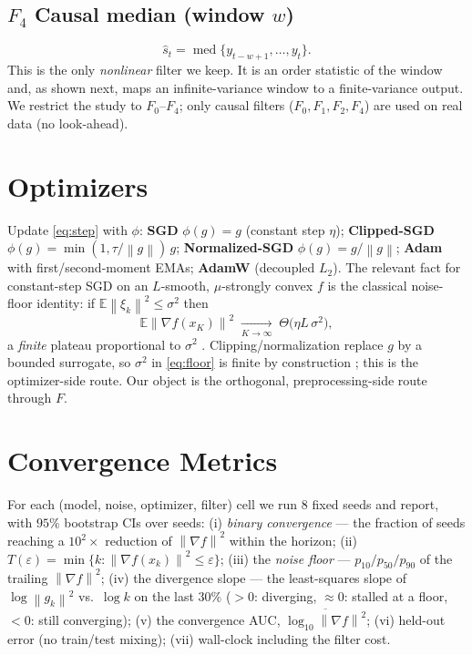 \documentclass[conference]{IEEEtran}
\newcommand{\E}{\mathbb{E}}
\newcommand{\norm}[1]{\left\lVert#1\right\rVert}
\DeclareMathOperator{\med}{med}
\begin{document}
\subsection{$F_4$ Causal median (window $w$)}
\begin{equation}
\hat s_t=\med\{y_{t-w+1},\dots,y_t\}. \label{eq:median}
\end{equation}
This is the only \emph{nonlinear} filter we keep. It is an order
statistic of the window and, as shown next, maps an infinite-variance
window to a finite-variance output. We restrict the study to
$F_0$--$F_4$; only causal filters ($F_0,F_1,F_2,F_4$) are used on real
data (no look-ahead).

\section{Optimizers}

Update \eqref{eq:step} with $\phi$: \textbf{SGD} $\phi(g)=g$ (constant
step $\eta$); \textbf{Clipped-SGD} $\phi(g)=\min(1,\tau/\norm{g})\,g$;
\textbf{Normalized-SGD} $\phi(g)=g/\norm{g}$; \textbf{Adam}
\cite{kingma2015adam} with first/second-moment EMAs; \textbf{AdamW}
\cite{loshchilov2019adamw} (decoupled $L_2$). The relevant fact for
constant-step SGD on an $L$-smooth, $\mu$-strongly convex $f$ is the
classical noise-floor identity: if $\E\norm{\xi_k}^2\le\sigma^2$ then
\begin{equation}
\E\norm{\nabla f(x_K)}^2\;\xrightarrow[K\to\infty]{}\;
\Theta\!\big(\eta L\,\sigma^2\big), \label{eq:floor}
\end{equation}
a \emph{finite} plateau proportional to $\sigma^2$
\cite{robbins1951sgd}. Clipping/normalization replace $g$ by a bounded
surrogate, so $\sigma^2$ in \eqref{eq:floor} is finite by construction
\cite{gorbunov2020clipping,cutkosky2021high,armacki2024nonlinear}; this
is the optimizer-side route. Our object is the orthogonal,
preprocessing-side route through $F$.

\section{Convergence Metrics}

For each (model, noise, optimizer, filter) cell we run $8$ fixed seeds
and report, with $95\%$ bootstrap CIs over seeds:
(i) \emph{binary convergence} --- the fraction of seeds reaching a
$10^{2}\times$ reduction of $\norm{\nabla f}^2$ within the horizon;
(ii) $T(\varepsilon)=\min\{k:\norm{\nabla f(x_k)}^2\le\varepsilon\}$;
(iii) the \emph{noise floor} --- $p_{10}/p_{50}/p_{90}$ of the
trailing $\norm{\nabla f}^2$;
(iv) the divergence slope --- the least-squares slope of
$\log\norm{g_k}^2$ vs.\ $\log k$ on the last $30\%$ ($>0$: diverging,
$\approx0$: stalled at a floor, $<0$: still converging);
(v) the convergence AUC, $\overline{\log_{10}\norm{\nabla f}^2}$;
(vi) held-out error (no train/test mixing);
(vii) wall-clock including the filter cost.
\end{document}
